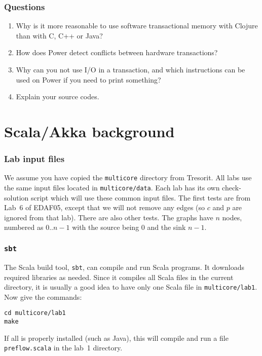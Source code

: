 \documentclass{forsete}
\begin{document}
{\subsubsection*{Questions}
\begin{enumerate}
\item Why is it more reasonable to use software transactional memory with
Clojure than with C, C++ or Java?
\item How does Power detect conflicts between hardware transactions?
\item Why can you not use I/O in a transaction, and which instructions can be used on Power if
you need to print something?
\item Explain your source codes.
\end{enumerate}

\newpage
\section{Scala/Akka background}

\subsubsection*{Lab input files}
We assume you have copied the {\tt multicore} directory from Tresorit.
All labs use the same input files located in {\tt multicore/data}.
Each lab has its own check-solution script which will use these common
input files. The first tests are from Lab~6 of EDAF05, except that we will not
remove any edges (so $c$ and $p$ are ignored from that lab). There are also other tests.
The graphs have $n$ nodes, numbered as $0..n-1$ with the source being $0$ and
the sink $n-1$.

\subsubsection*{{\tt sbt}}
The Scala build tool, {\tt sbt}, can compile and run Scala programs. It downloads required libraries as needed.
Since it compiles all Scala files in the current directory, it is usually a good idea to have only one Scala file
in {\tt multicore/lab1}.
Now give the commands:
\begin{verbatim}
cd multicore/lab1
make
\end{verbatim}
If all is properly installed (such as Java), this will compile and run a file {\tt preflow.scala} in the
lab~1 directory.

}
\end{document}
